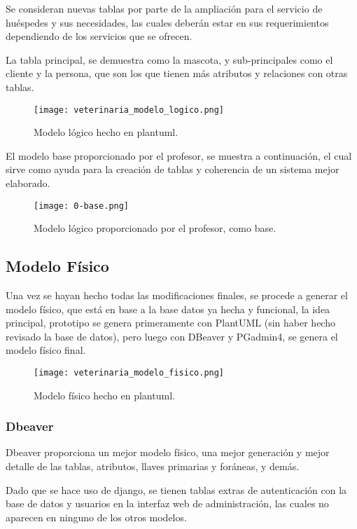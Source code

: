 \documentclass[
  12pt,
  hidelinks,
  a4paper,
  headings=standardclasses,
  headings=big,
  spanish
]{scrartcl}
\begin{document}
Se consideran nuevas tablas por parte de la ampliación para el servicio de huéspedes y sus necesidades, las cuales deberán estar en sus requerimientos dependiendo de los servicios que se ofrecen.

La tabla principal, se demuestra como la mascota, y sub-principales como el cliente y la persona, que son los que tienen más atributos y relaciones con otras tablas.

\begin{figure}[H]
  \centering
  \texttt{[image: veterinaria\_modelo\_logico.png]}
  \caption{Modelo lógico hecho en plantuml.}
\end{figure}

\pagebreak
El modelo base proporcionado por el profesor, se muestra a continuación, el cual sirve como ayuda para la creación de tablas y coherencia de un sistema mejor elaborado.

\begin{figure}[H]
  \centering
  \texttt{[image: 0-base.png]}
  \caption{Modelo lógico proporcionado por el profesor, como base.}
\end{figure}

\pagebreak
\subsection{Modelo Físico}
Una vez se hayan hecho todas las modificaciones finales, se procede a generar el modelo físico, que está en base a la base datos ya hecha y funcional, la idea principal, prototipo se genera primeramente con PlantUML (sin haber hecho revisado la base de datos), pero luego con DBeaver y PGadmin4, se genera el modelo físico final.

\begin{figure}[H]
  \centering
  \texttt{[image: veterinaria\_modelo\_fisico.png]}
  \caption{Modelo físico hecho en plantuml.}
\end{figure}

\subsubsection{Dbeaver}

Dbeaver proporciona un mejor modelo físico, una mejor generación y mejor detalle de las tablas, atributos, llaves primarias y foráneas, y demás.

Dado que se hace uso de django, se tienen tablas extras de autenticación con la base de datos y usuarios en la interfaz web de administración, las cuales no aparecen en ninguno de los otros modelos.
\end{document}

